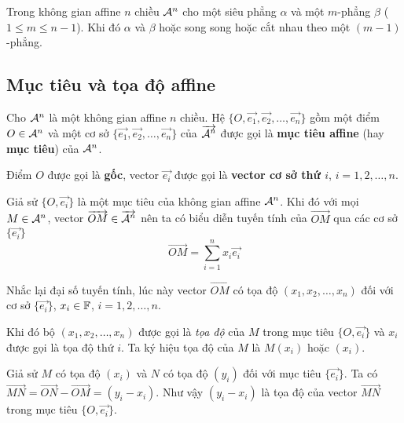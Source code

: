 \begin{theorem}
    Trong không gian affine $n$ chiều $\mathcal{A}^n$ cho một siêu phẳng $\alpha$ và một $m$-phẳng $\beta$ ($1 \leq m \leq n-1$). Khi đó $\alpha$ và $\beta$ hoặc song song hoặc cắt nhau theo một $(m-1)$-phẳng.
\end{theorem}

\subsection*{Mục tiêu và tọa độ affine}

\begin{definition}
    Cho $\mathcal{A}^n$ là một không gian affine $n$ chiều. Hệ $\{O, \overrightarrow{e_1}, \overrightarrow{e_2}, \ldots, \overrightarrow{e_n}\}$ gồm một điểm $O \in \mathcal{A}^n$ và một cơ sở $\{\overrightarrow{e_1}, \overrightarrow{e_2}, \ldots, \overrightarrow{e_n}\}$ của $\overrightarrow{\mathcal{A}^n}$ được gọi là \textbf{mục tiêu affine} (hay \textbf{mục tiêu}) của $\mathcal{A}^n$.
    
    Điểm $O$ được gọi là \textbf{gốc}, vector $\overrightarrow{e_i}$ được gọi là \textbf{vector cơ sở thứ $i$}, $i = 1, 2, \ldots, n$. 
\end{definition}

Giả sử $\{O, \overrightarrow{e_i}\}$ là một mục tiêu của không gian affine $\mathcal{A}^n$. Khi đó với mọi $M \in \mathcal{A}^n$, vector $\overrightarrow{OM} \in \overrightarrow{\mathcal{A}^n}$ nên ta có biểu diễn tuyến tính của $\overrightarrow{OM}$ qua các cơ sở $\{\overrightarrow{e_i}\}$ \[\overrightarrow{OM} = \sum_{i=1}^n x_i \overrightarrow{e_i}\]

Nhắc lại đại số tuyến tính, lúc này vector $\overrightarrow{OM}$ có tọa độ $(x_1, x_2, \ldots, x_n)$ đối với cơ sở $\{\overrightarrow{e_i}\}$, $x_i \in \mathbb{F}$, $i = 1, 2, \ldots, n$.

Khi đó bộ $(x_1, x_2, \ldots, x_n)$ được gọi là \textit{tọa độ} của $M$ trong mục tiêu $\{O, \overrightarrow{e_i}\}$ và $x_i$ được gọi là tọa độ thứ $i$. Ta ký hiệu tọa độ của $M$ là $M(x_i)$ hoặc $(x_i)$.

Giả sử $M$ có tọa độ $(x_i)$ và $N$ có tọa độ $(y_i)$ đối với mục tiêu $\{\overrightarrow{e_i}\}$. Ta có $\overrightarrow{MN} = \overrightarrow{ON} - \overrightarrow{OM} = (y_i - x_i)$. Như vậy $(y_i - x_i)$ là tọa độ của vector $\overrightarrow{MN}$ trong mục tiêu $\{O, \overrightarrow{e_i}\}$.

